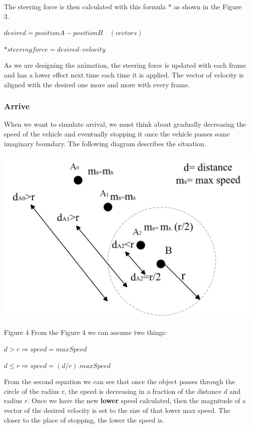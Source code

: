 \documentclass[10pt,twoside,english,a4paper]{article}
\begin{document}
The steering force is then calculated with this formula * as shown 
in the Figure 3.

\begin{center}
$desired =position A - position B \quad (vectors)$ \par
$ *steering force= desired – velocity$

\end{center}

As we are designing the animation, the steering force is updated with 
each frame and has a lower effect next time each time it is applied. 
The vector of velocity is aligned with the desired one
more and more with every frame.

\subsubsection{Arrive} \label{arrive}

When we want to simulate arrival, we must think about gradually 
decreasing the speed of the vehicle and eventually stopping it once the 
vehicle passes some imaginary boundary. The following diagram describes 
the situation. 

\includegraphics[scale=0.22]{diagram_radius.png}\par
Figure 4
\bigbreak
From the Figure 4 we can assume two things: 

\begin{center}
$d>r 	\Rightarrow speed = maxSpeed$ \par 
$d \leq r \Rightarrow speed = (d/r)  . maxSpeed$ 
\end{center} 

From the second equation we can see that once the object passes through
the circle of the radius r, the speed is decreasing in a fraction of 
the distance $d$ and radius $r$. Once we have the new \textbf{lower} 
speed calculated, then the magnitude of a vector of the desired velocity is set
to the size of that lower max speed. The closer to the place of stopping,
the lower the speed is.
\end{document}
